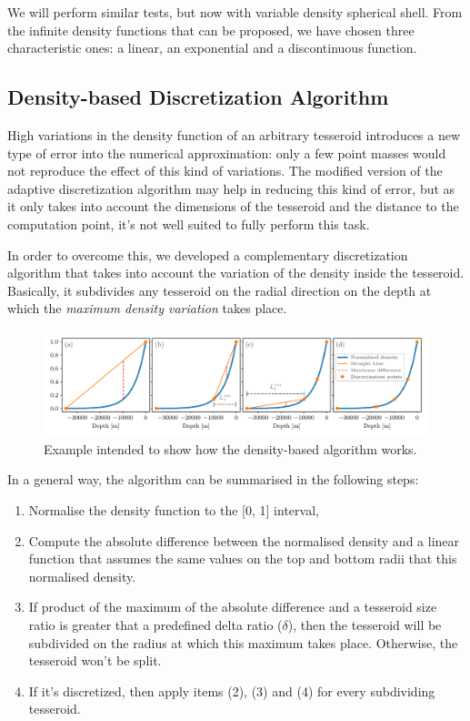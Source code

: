 \documentclass[extra]{gji}
\begin{document}
We will perform similar tests, but now with variable density spherical 
shell.
From the infinite density functions that can be proposed, we have 
chosen three characteristic ones: a linear, an exponential and a 
discontinuous function.


\subsection{Density-based Discretization Algorithm}

High variations in the density function of an arbitrary tesseroid 
introduces a new type of error into the numerical approximation: only a 
few point masses would not reproduce the effect of this kind of 
variations.
The modified version of the adaptive discretization algorithm may help 
in reducing this kind of error, but as it only takes into account the 
dimensions of the tesseroid and the distance to the computation point, 
it's not well suited to fully perform this task.

In order to overcome this, we developed a complementary discretization 
algorithm that takes into account the variation of the density inside 
the tesseroid. Basically, it subdivides any tesseroid on the radial 
direction on the depth at which the \emph{maximum density variation} 
takes place.

\begin{figure}
\centering
\includegraphics[width=\linewidth]
    {figures/density-based-discretization-algorithm.pdf}
\caption{
    Example intended to show how the density-based algorithm works.}
\label{fig:density-discretization-algorithm}
\end{figure}

In a general way, the algorithm can be summarised in the following steps:

\begin{enumerate}
\renewcommand{\theenumi}{(\arabic{enumi})}
    \item Normalise the density function to the [0, 1] interval,
    \item Compute the absolute difference between the normalised 
          density and a linear function that assumes the same values on the 
          top and bottom radii that this normalised density.
    \item If product of the maximum of the absolute difference and a 
          tesseroid size ratio is greater that a predefined delta ratio 
          ($\delta$), then the tesseroid will be subdivided on the 
          radius at which this maximum takes place. Otherwise, the 
          tesseroid won't be split.
    \item If it's discretized, then apply items (2), (3) and (4) for 
          every subdividing tesseroid.
\end{enumerate}
\end{document}
